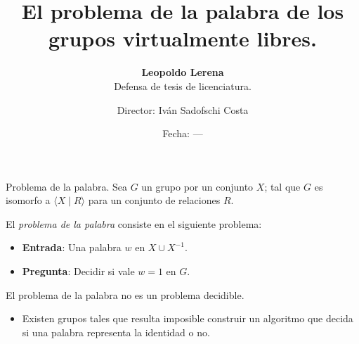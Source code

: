 \documentclass[aspectratio=169, 10pt]{beamer}
\title{El problema de la palabra de los grupos virtualmente libres.}
\subtitle{\textbf{Leopoldo Lerena} \\
		Defensa de tesis de licenciatura.}
\date{Fecha: ---}
\author{Director: Iván Sadofschi Costa}
\institute{Universidad de Buenos Aires}
\begin{document}
	\maketitle

	
	
	
	\begin{frame}[fragile]{Problema de la palabra.}
		Sea $G$ un grupo \fg por un conjunto $X$; 
		tal que $G$ es isomorfo a $\langle X \mid R \rangle$ para un conjunto de relaciones $R$.
		
		El \emph{problema de la palabra} consiste en el siguiente problema:
	
		\begin{itemize}
					\item 
						\textbf{Entrada}: Una palabra $w$ en $X \cup X^{-1}$.
					
					\item 
						\textbf{Pregunta}: Decidir si vale $w=1$ en $G$.
		\end{itemize}

		El problema de la palabra no es un problema \alert{decidible}.
		\begin{itemize}
			\item 
				Existen grupos tales que resulta imposible construir un algoritmo que decida si una palabra representa la identidad o no.
		\end{itemize}
		

	\end{frame}
\end{document}
